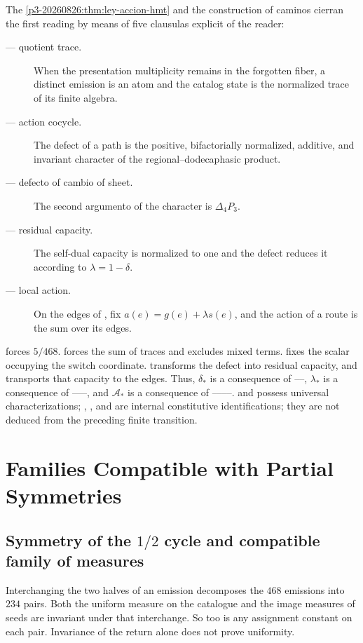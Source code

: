 The \cref{p3-20260826:thm:ley-accion-hmt} and the construction of caminos cierran the first
reading by means of five clausulas explicit of the reader:
\begin{description}
  \item[\HTr --- quotient trace.] When the presentation multiplicity
  remains in the forgotten fiber, a distinct emission is an atom and the
  catalog state is the normalized trace of its finite algebra.
  \item[\HAdd --- action cocycle.] The defect of a path is the positive,
  bifactorially normalized, additive, and invariant character of the
  regional--dodecaphasic product.
  \item[\HDef --- defecto of cambio of sheet.] The second argumento of the character is
  \(\Delta_4P_3\).
  \item[\HRes --- residual capacity.] The self-dual capacity is normalized to
  one and the defect reduces it according to \(\lambda=1-\delta\).
  \item[\HLoc --- local action.] On the edges of \Gtr, fix
  \(a(e)=g(e)+\lambda s(e)\), and the action of a route is the sum over its
  edges.
\end{description}
\HTr forces \(5/468\). \HAdd forces the sum of traces and excludes mixed
terms. \HDef fixes the scalar occupying the switch coordinate. \HRes transforms
the defect into residual capacity, and \HLoc transports that capacity to the edges.
Thus, \(\delta_*\) is a consequence of \HTr--\HAdd--\HDef, \(\lambda_*\) is a consequence of
\HTr--\HAdd--\HDef--\HRes, and \(\mathcal A_*\) is a consequence of
\HTr--\HAdd--\HDef--\HRes--\HLoc. \HTr and \HAdd possess universal characterizations; \HDef, \HRes, and
\HLoc are internal constitutive identifications; they are not deduced from the
preceding finite transition.

\section{Families Compatible with Partial Symmetries}

\subsection{Symmetry of the \(1/2\) cycle and compatible family of measures}

Interchanging the two halves of an emission decomposes the \(468\)
emissions into \(234\) pairs. Both the uniform measure on the catalogue and the
image measures of seeds are invariant under that interchange. So too is
any assignment constant on each pair. Invariance of the return
alone does not prove uniformity.

